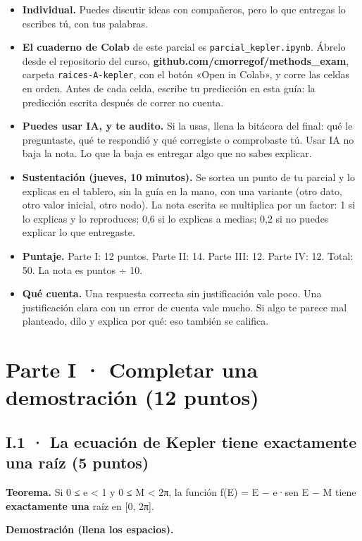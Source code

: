 \begin{itemize}
\tightlist
\item
  \textbf{Individual.} Puedes discutir ideas con compañeros, pero lo que entregas lo escribes tú, con tus palabras.
\item
  \textbf{El cuaderno de Colab} de este parcial es \texttt{parcial\_kepler.ipynb}. Ábrelo desde el repositorio del curso, \textbf{github.com/cmorregof/methods\_exam}, carpeta \texttt{raices-A-kepler}, con el botón «Open in Colab», y corre las celdas en orden. Antes de cada celda, escribe tu predicción en esta guía: la predicción escrita después de correr no cuenta.
\item
  \textbf{Puedes usar IA, y te audito.} Si la usas, llena la bitácora del final: qué le preguntaste, qué te respondió y qué corregiste o comprobaste tú. Usar IA no baja la nota. Lo que la baja es entregar algo que no sabes explicar.
\item
  \textbf{Sustentación (jueves, 10 minutos).} Se sortea un punto de tu parcial y lo explicas en el tablero, sin la guía en la mano, con una variante (otro dato, otro valor inicial, otro nodo). La nota escrita se multiplica por un factor: 1 si lo explicas y lo reproduces; 0,6 si lo explicas a medias; 0,2 si no puedes explicar lo que entregaste.
\item
  \textbf{Puntaje.} Parte I: 12 puntos. Parte II: 14. Parte III: 12. Parte IV: 12. Total: 50. La nota es puntos ÷ 10.
\item
  \textbf{Qué cuenta.} Una respuesta correcta sin justificación vale poco. Una justificación clara con un error de cuenta vale mucho. Si algo te parece mal planteado, dilo y explica por qué: eso también se califica.
\end{itemize}

\section{Parte I · Completar una demostración (12 puntos)}

\subsection{I.1 · La ecuación de Kepler tiene exactamente una raíz (5 puntos)}

\textbf{Teorema.} Si 0 ≤ e \textless{} 1 y 0 ≤ M \textless{} 2π, la función f(E) = E − e·sen E − M tiene \textbf{exactamente una} raíz en {[}0, 2π{]}.

\textbf{Demostración (llena los espacios).}


